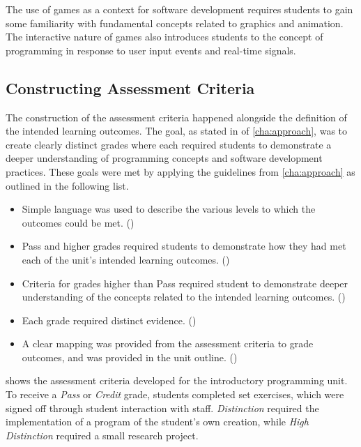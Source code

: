 The use of games as a context for software development requires students to gain some familiarity with fundamental concepts related to graphics and animation. The interactive nature of games also introduces students to the concept of programming in response to user input events and real-time signals.

\clearpage
\subsection{Constructing Assessment Criteria} %
\label{sub:intro_constructing_assessment_criteria}

The construction of the assessment criteria happened alongside the definition of the intended learning outcomes. The goal, as stated in  of \cref{cha:approach}, was to create clearly distinct grades where each required students to demonstrate a deeper understanding of programming concepts and software development practices. These goals were met by applying the guidelines from \cref{cha:approach} as outlined in the following list.

\begin{itemize}[noitemsep,nolistsep]
	\item Simple language was used to describe the various levels to which the outcomes could be met. ()
	\item Pass and higher grades required students to demonstrate how they had met each of the unit's intended learning outcomes. ()
	\item Criteria for grades higher than Pass required student to demonstrate deeper understanding of the concepts related to the intended learning outcomes. ()
	\item Each grade required distinct evidence. ()
	\item A clear mapping was provided from the assessment criteria to grade outcomes, and was provided in the unit outline. ()
\end{itemize}


 shows the assessment criteria developed for the introductory programming unit. To receive a \emph{Pass} or \emph{Credit} grade, students completed set exercises, which were signed off through student interaction with staff. \emph{Distinction} required the implementation of a program of the student's own creation, while \emph{High Distinction} required a small research project.

